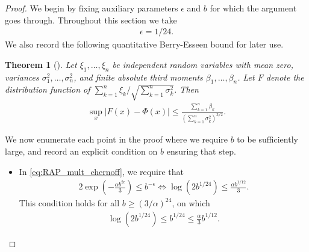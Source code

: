 \documentclass[11pt]{amsart}
\numberwithin{equation}{section}
\numberwithin{equation}{section}
\newcommand{\1}{\mathbbm{1}}
\newtheorem{theorem}{Theorem}[section]
\theoremstyle{definition}
\begin{document}
\begin{appendices}
\begin{proof}
    We begin by fixing auxiliary parameters $\epsilon$ and $b$ for which the argument goes through. Throughout this section we take
    \begin{align*}
        \epsilon = 1/24.
    \end{align*}
    We also record the following quantitative Berry-Esseen bound for later use.
    \begin{theorem}[{\cite[Theorem 1]{zolotarev1967sharpening}}] \label{thm:berry_esseen_quantitative}
        Let $\xi_1, \dots, \xi_n$ be independent random variables with mean zero, variances $\sigma_1^2, \dots, \sigma_n^2$, and finite absolute third moments $\beta_1, \dots, \beta_n$. Let $F$ denote the distribution function of $\sum_{k=1}^n \xi_k/\sqrt{\sum_{k=1}^n \sigma_k^2}$. Then
        \begin{align*}
            \sup_x |F(x) - \Phi(x)| \leq \frac{\sum_{k=1}^n \beta_k}{\left( \sum_{k=1}^n \sigma_k^2 \right)^{3/2}}.
        \end{align*}
    \end{theorem}
    We now enumerate each point in the proof where we require $b$ to be sufficiently large, and record an explicit condition on $b$ ensuring that step.
    \begin{itemize}
        \item In \eqref{eq:RAP_mult_chernoff}, we require that
        \begin{align} \label{eq:RAP_mult_chernoff_numerical_cond}
            2\exp\left( -\frac{\alpha b^{2\epsilon}}{3} \right) \leq b^{-\epsilon} \iff \log \left( 2b^{1/24} \right) \leq \frac{\alpha b^{1/12}}{3}.
        \end{align}
        This condition holds for all $b \geq (3/\alpha)^{24}$, on which
        \begin{align*}
            \log \left( 2b^{1/24} \right) \leq b^{1/24} \leq \frac{\alpha}{3}b^{1/12}.
        \end{align*}
    

\end{itemize}
\end{proof}
\end{appendices}
\end{document}

